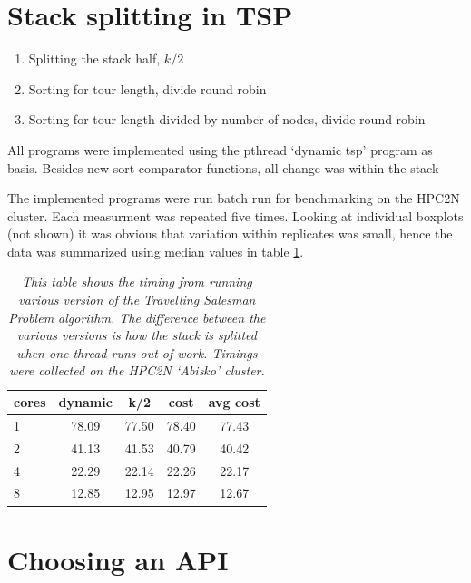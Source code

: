 \documentclass[a4paper,11pt,twoside]{article}
\begin{document}
\section{Stack splitting in TSP}
\begin{enumerate}[label={\alph*)}]
\item Splitting the stack half, $k/2$
\item Sorting for tour length, divide round robin
\item Sorting for tour-length-divided-by-number-of-nodes, divide round robin
\end{enumerate}

All programs were implemented using the pthread `dynamic tsp' program as basis. Besides new sort comparator functions, all change was within the stack 


The implemented programs were run batch run for benchmarking on the HPC2N cluster. Each measurment was repeated five times. Looking at individual boxplots (not shown) it was obvious that variation within replicates was small, hence the data was summarized using median values in table \ref{tab:tsp}.

\begin{table}[]
\centering
\caption{\textit{This table shows the timing from running various version of the Travelling Salesman Problem algorithm. The difference between the various versions is how the stack is splitted when one thread runs out of work. Timings were collected on the HPC2N `Abisko' cluster.}}
\label{tab:tsp}
\begin{tabular}{l|cccc}
cores & dynamic & k/2   & cost  & avg cost \\ \hline
1     & 78.09   & 77.50 & 78.40 & 77.43    \\
2     & 41.13   & 41.53 & 40.79 & 40.42    \\
4     & 22.29   & 22.14 & 22.26 & 22.17    \\
8     & 12.85   & 12.95 & 12.97 & 12.67   
\end{tabular}
\end{table}


\section{Choosing an API}




\end{document}
